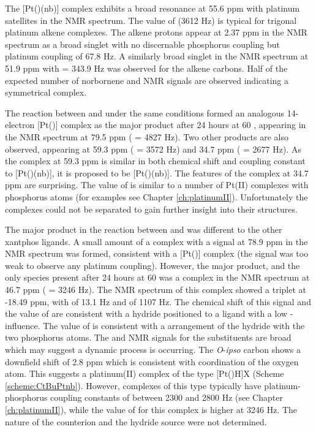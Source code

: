 
The [Pt(\tButhixantphos)(nb)] complex exhibits a broad resonance at 55.6 ppm with platinum satellites in the \phosphorus{} NMR spectrum.  The value of \JPtP{} (3612 Hz) is typical for trigonal platinum alkene complexes.\cite{Carr1991}  The alkene protons appear at 2.37 ppm in the \proton{} NMR spectrum as a broad singlet with no discernable phosphorus coupling but platinum coupling of 67.8 Hz. A similarly broad singlet in the \carbon{} NMR spectrum at 51.9 ppm with \JPtC{} = 343.9 Hz was observed for the alkene carbons.  Half of the expected number of norbornene and \tButhixantphos{} NMR signals are observed indicating a symmetrical complex.

The reaction between \tBusixantphos{} and \ce{[Pt(nb)3]} under the same conditions formed an analogous 14-electron [Pt(\tBusixantphos)] complex as the major product after 24 hours at 60 \degC{}, appearing in the \phosphorus{} NMR spectrum at 79.5 ppm (\JPtP{} = 4827 Hz).  Two other products are also observed, appearing at 59.3 ppm (\JPtP{} = 3572 Hz) and 34.7 ppm (\JPtP{} = 2677 Hz).  As the complex at 59.3 ppm is similar in both chemical shift and coupling constant to [Pt(\tButhixantphos)(nb)], it is proposed to be [Pt(\tBusixantphos)(nb)].  The features of the complex at 34.7 ppm are surprising.  The value of \JPtP{} is similar to a number of Pt(II) complexes with \trans{} phosphorus atoms (for examples see Chapter \ref{ch:platinumII}).  Unfortunately the complexes could not be separated to gain further insight into their structures.

The major product in the reaction between \tBuxantphos{} and \ce{[Pt(nb)3]} was different to the other xantphos ligands.  A small amount of a complex with a signal at 78.9 ppm in the \phosphorus{} NMR spectrum was formed, consistent with a [Pt(\tBuxantphos)] complex (the signal was too weak to observe any platinum coupling).  However, the major product, and the only species present after 24 hours at 60\degC{} was a complex in the \phosphorus{} NMR spectrum at 46.7 ppm (\JPtP{} = 3246 Hz).  The \proton{} NMR spectrum of this complex showed a triplet at -18.49 ppm, with \JPH{} of 13.1 Hz and \JPtH{} of 1107 Hz.  The chemical shift of this signal and the value of \JPtH{} are consistent with a hydride positioned \trans{} to a ligand with a low \trans{}-influence.  The value of \JPH{} is consistent with a \cis{} arrangement of the hydride with the two phosphorus atoms.  The \proton{} and \carbon{} NMR signals for the \tBu{} substituents are broad which may suggest a dynamic process is occurring.  The \emph{O}-\emph{ipso} carbon shows a downfield shift of 2.8 ppm which is consistent with coordination of the oxygen atom.  This suggests a platinum(II) complex of the type [Pt(\tBuxantphosk)H]X (Scheme \ref{scheme:CtBuPtnb}).  However, complexes of this type typically have platinum-phosphorus coupling constants of between 2300 and 2800 Hz (see Chapter \ref{ch:platinumII}), while the value of \JPtP{} for this complex is higher at 3246 Hz.  The nature of the counterion and the hydride source were not determined.  

